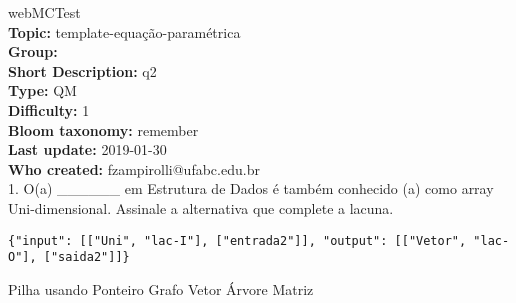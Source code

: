 \documentclass[10pt,brazil,a4paper]{exam}
\begin{document}
\pagestyle{empty}

\noindent\Huge{webMCTest}\normalsize\vspace{5mm}\\
\noindent\textbf{Topic:} template-equação-paramétrica\\
\noindent\textbf{Group:} \\
\noindent\textbf{Short Description:} q2\\
\noindent\textbf{Type:} QM\\
\noindent\textbf{Difficulty:} 1\\
\noindent\textbf{Bloom taxonomy:} remember\\
\noindent\textbf{Last update:} 2019-01-30\\
\noindent\textbf{Who created:} fzampirolli@ufabc.edu.br\\

 \hspace{-1mm} 1. %
O(a) \_\_\_\_\_\_ em Estrutura de Dados é também conhecido (a) como array Uni-dimensional. Assinale a alternativa que complete a lacuna.


\begin{verbatim}
{"input": [["Uni", "lac-I"], ["entrada2"]], "output": [["Vetor", "lac-O"], ["saida2"]]}
\end{verbatim}

\n\n

\vspace{2mm}\begin{oneparchoices}
\choice {}Pilha usando Ponteiro
\choice {}Grafo
\choice {}Vetor
\choice {}Árvore
\choice {}Matriz
\end{oneparchoices}\vspace{0mm}
\end{document}

